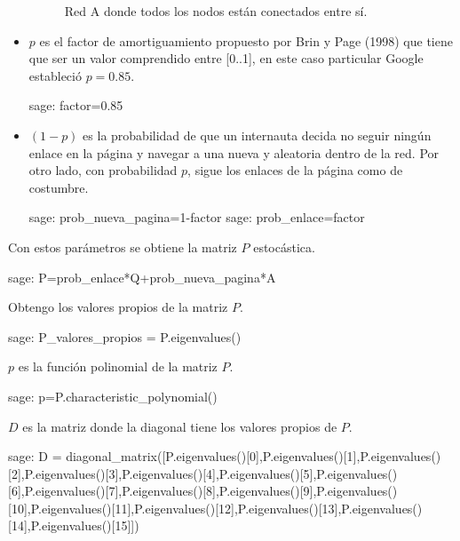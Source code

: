 \begin{itemize}
    \begin{figure}[H]
        \centering
        \label{redA_2}
        \caption{Red A donde todos los nodos están conectados entre sí.}
    \end{figure}
    \item $p$ es el factor de amortiguamiento propuesto por Brin y Page (1998) que tiene que ser un valor 
    comprendido entre [0..1], en este caso particular Google estableció $p=0.85$.
    \begin{sagecommandline}
        sage: factor=0.85
    \end{sagecommandline}
    \item  $(1-p)$ es la probabilidad de que un internauta decida no seguir ningún enlace en la página y 
    navegar a una nueva y aleatoria dentro de la red. Por otro lado, con probabilidad $p$, sigue los enlaces de 
    la página como de costumbre.
    \begin{sagecommandline}
        sage: prob_nueva_pagina=1-factor
        sage: prob_enlace=factor
    \end{sagecommandline}
\end{itemize}

\par Con estos parámetros se obtiene la matriz $P$ estocástica.
\begin{sagecommandline}
    sage: P=prob_enlace*Q+prob_nueva_pagina*A
\end{sagecommandline}

\par Obtengo los valores propios de la matriz $P$.
\begin{sagecommandline}
    sage: P_valores_propios = P.eigenvalues()
\end{sagecommandline}
\par $p$ es la función polinomial de la matriz $P$.
\begin{sagecommandline}
    sage: p=P.characteristic_polynomial()
\end{sagecommandline}
\par $D$ es la matriz donde la diagonal tiene los valores propios de $P$.
\begin{sagecommandline}
    sage: D = diagonal_matrix([P.eigenvalues()[0],P.eigenvalues()[1],P.eigenvalues()[2],P.eigenvalues()[3],P.eigenvalues()[4],P.eigenvalues()[5],P.eigenvalues()[6],P.eigenvalues()[7],P.eigenvalues()[8],P.eigenvalues()[9],P.eigenvalues()[10],P.eigenvalues()[11],P.eigenvalues()[12],P.eigenvalues()[13],P.eigenvalues()[14],P.eigenvalues()[15]])
\end{sagecommandline}

